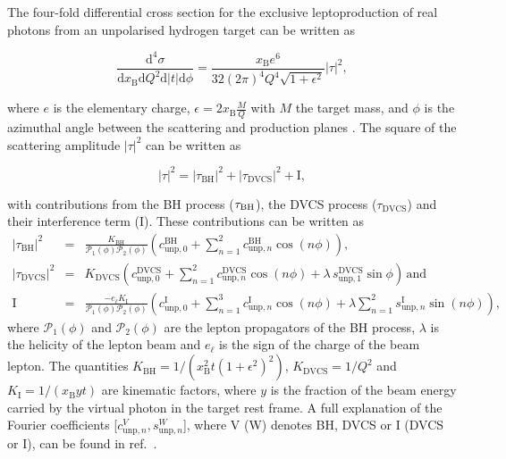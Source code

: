 The four-fold differential cross section for the exclusive leptoproduction of real photons
from an unpolarised hydrogen target can be written as \cite{Bel02b}
\begin{center}
\begin{equation}
\frac{\textrm{d}^4\sigma}{\textrm{d}x_{\textrm{B}}\textrm{d}Q^{2}\textrm{d}
|t|\textrm{d}\phi} =
\frac{x_{\textrm{B}}e^{6}}{32(2\pi)^{4} Q^{4}\sqrt{1+\epsilon^{2}}}
|\tau|^{2},
\end{equation}
\end{center}
where $e$ is the elementary
charge, $\epsilon=2x_\textrm{B}\frac{M}{Q}$ with $M$
the target mass, and $\phi$ is the
azimuthal angle between the scattering and production planes \cite{Tre04}.
The {square of the} scattering amplitude $|\tau|^2$ can be written as
\begin{center}
\begin{equation}
|\tau|^{2} = |\tau_{\textrm{BH}}|^{2} +
|\tau_{\textrm{DVCS}}|^{2} + \textrm{I},
\end{equation}
\end{center}
with contributions from the \textrm{BH} process ($\tau_{\textrm{\textrm{BH}}}$),
the DVCS process
($\tau_{\textrm{DVCS}}$) and their interference term (I). These
contributions can be written as
\begin{eqnarray}
 |\tau_{\textrm{BH}}|^{2} &=&
 \frac{K_{\textrm{BH}}}{\mathcal{P}_{1}(\phi)\mathcal{P}_{2}(\phi)} \left(c_{\textrm{unp},0}^{\textrm{BH}} + \sum_{n=1}^2
  c_{\textrm{unp},n}^{\textrm{BH}}\cos(n\phi)\right), \label{e:tbh}\\
|\tau_{\textrm{DVCS}}|^{2} &=&
K_{\textrm{DVCS}}\left(c_{\textrm{unp},0}^{\textrm{DVCS}} +
\sum_{n=1}^2
c_{\textrm{unp},n}^{\textrm{DVCS}}\cos(n\phi) + \lambda\,
s_{\textrm{unp},1}^{\textrm{DVCS}}\sin\phi\right)\,\textrm{and}
\label{e:tdvcs}\\
 \textrm{I} &=& \frac{- e_\ell
K_{\textrm{I}}}{\mathcal{P}_{1}(\phi)\mathcal{P}_{2}(\phi)}\left(c_{\textrm{unp},0}^{\textrm{
I}}+
\sum_{n=1}^3 c_{\textrm{unp},n}^{\textrm{I}}\cos(n\phi) + \lambda \sum_{n=1}^2
s_{\textrm{unp},n}^{\textrm{I}}\sin(n\phi)\right),\label{e:ti}
\end{eqnarray}
where $\mathcal{P}_1(\phi)$ and $\mathcal{P}_2(\phi)$ are the lepton propagators
of the BH process, $\lambda$ is the
helicity of the lepton beam and $e_\ell$ is the sign of the charge of
 the beam lepton.  The
quantities $K_{\textrm{BH}}=1/(x_\textrm{B}^2t(1+\epsilon^2)^2)$,
$K_{\textrm{DVCS}}=1/Q^2$
and $K_{\textrm{I}}=1/(x_{\textrm{B}}yt)$ are kinematic factors, where
$y$ is the fraction of the beam energy carried by the virtual photon in
the target rest frame. A full explanation of the Fourier coefficients [$c_{\textrm{unp},n}^V,s_{\textrm{unp},n}^W$], where V (W) denotes BH, DVCS or I (DVCS or I), can be found in ref.~\cite{Bel02b}.
 
